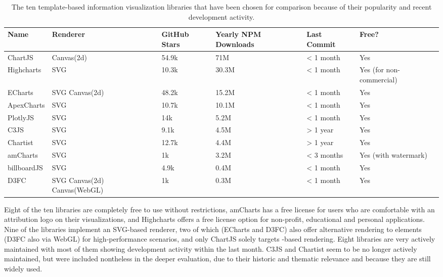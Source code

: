 \begin{table}[tp]
\tablestretch
{}
\centering
\begin{small}
\begin{tabularx}{\linewidth}{Xm{2.3cm}lm{1.8cm}lm{4cm}}
\toprule
Name & Renderer & GitHub Stars & Yearly NPM \newline Downloads & Last Commit & Free? \\
\midrule
ChartJS & Canvas(2d) & 54.9k & 71M & < 1 month & Yes \\
Highcharts & SVG & 10.3k & 30.3M & < 1 month & Yes (for non-commercial) \\
ECharts & SVG \newline Canvas(2d) & 48.2k & 15.2M & < 1 month & Yes \\
ApexCharts & SVG & 10.7k & 10.1M & < 1 month & Yes \\
PlotlyJS & SVG & 14k & 5.2M & < 1 month & Yes \\
C3JS & SVG & 9.1k & 4.5M & > 1 year & Yes \\
Chartist & SVG & 12.7k & 4.4M & > 1 year & Yes \\
amCharts & SVG & 1k & 3.2M & < 3 months & Yes (with watermark) \\
billboardJS & SVG & 4.9k & 0.4M & < 1 month & Yes \\
D3FC & SVG \newline Canvas(2d) \newline Canvas(WebGL) & 1k & 0.3M & < 1 month & Yes \\
\bottomrule
\end{tabularx}
\end{small}
\caption[Compared Template-Based Information Visualization Libraries]{
  The ten template-based information visualization libraries that have
  been chosen for comparison because of their popularity and recent
  development activity. }
\label{tab:ComparedTemplateBasedLibraries}
\end{table}


Eight of the ten libraries are completely free to use without
restrictions, amCharts has a free license for users who are
comfortable with an attribution logo on their visualizations, and
Highcharts offers a free license option for non-profit, educational
and personal applications. Nine of the libraries implement an
SVG-based renderer, two of which (ECharts and D3FC) also offer
alternative rendering to  elements (D3FC also via
WebGL) for high-performance scenarios, and only ChartJS solely targets
-based rendering. Eight libraries are very actively
maintained with most of them showing development activity within the
last month. C3JS and Chartist seem to be no longer actively
maintained, but were included nontheless in the deeper evaluation, due
to their historic and thematic relevance and because they are still
widely used.

